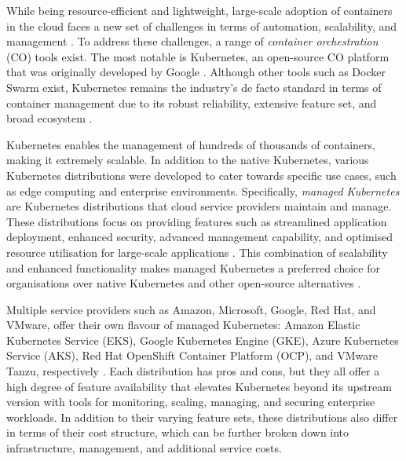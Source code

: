 While being resource-efficient and lightweight, large-scale adoption of containers in the cloud faces a new set of challenges in terms of automation, scalability, and management \cite{pereiraferreiraPerformanceEvaluationContainers2019,felterUpdatedPerformanceComparison2015}. To address these challenges, a range of \textit{container orchestration} (CO) tools exist. The most notable is Kubernetes, an open-source CO platform that was originally developed by Google \cite{Kubernetes, pereiraferreiraPerformanceEvaluationContainers2019}. Although other tools such as Docker Swarm exist, Kubernetes remains the industry’s de facto standard in terms of container management due to its robust reliability, extensive feature set, and broad ecosystem \cite{truyenComprehensiveFeatureComparison2019,KubernetesKubernetesProductionGrade,SwarmMode0200}.

Kubernetes enables the management of hundreds of thousands of containers, making it extremely scalable. In addition to the native Kubernetes, various Kubernetes distributions were developed to cater towards specific use cases, such as edge computing and enterprise environments. Specifically, \textit{managed Kubernetes} are Kubernetes distributions that cloud service providers maintain and manage. These distributions focus on providing features such as streamlined application deployment, enhanced security, advanced management capability, and optimised resource utilisation for large-scale applications \cite{WhatEnterpriseKubernetes, truyenComprehensiveFeatureComparison2019}. This combination of scalability and enhanced functionality makes managed Kubernetes a preferred choice for organisations over native Kubernetes and other open-source alternatives \cite{redhatinc.StateKubernetesSecurity2024, canonicalKubernetesCloudNative2022, portworxKubernetesAdoptionSurvey2021, broadcomStateKubernetes20232023}.

Multiple service providers such as Amazon, Microsoft, Google, Red Hat, and VMware, offer their own flavour of managed Kubernetes: Amazon Elastic Kubernetes Service (EKS), Google Kubernetes Engine (GKE), Azure Kubernetes Service (AKS), Red Hat OpenShift Container Platform (OCP), and VMware Tanzu, respectively \cite{AmazonEKSCustomers, GKEOverviewGoogle, nickomangAzureKubernetesService, redhatinc.RedHatOpenShift, VMwareTanzuPlatform}. Each distribution has pros and cons, but they all offer a high degree of feature availability that elevates Kubernetes beyond its upstream version with tools for monitoring, scaling, managing, and securing enterprise workloads. In addition to their varying feature sets, these distributions also differ in terms of their cost structure, which can be further broken down into infrastructure, management, and additional service costs.

